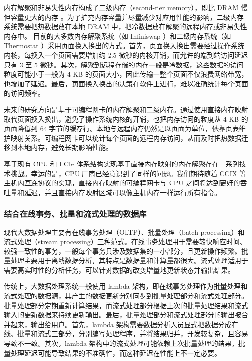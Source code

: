 内存解聚和非易失性内存构成了二级内存（second-tier memory），即比 DRAM 慢但容量更大的内存 \cite{dulloor2016data}。为了扩充内存容量并尽量减少对应用性能的影响，二级内存系统需要把热数据放在本地 DRAM 中，把冷数据放在解聚的远程内存或非易失性内存中。
目前的大多数内存解聚系统（如 Infiniswap \cite{gu2017efficient}）和二级内存系统（如 Thermostat \cite{agarwal2017thermostat}）采用页面换入换出的方式。首先，页面换入换出需要经过操作系统内核，每换入一个页面需要增加约 2.5 微秒的内核开销，而允许的端到端访问延迟只有 3 至 5 微秒。其次，解聚到远程存储的内存一般是冷数据，这些数据的访问粒度可能小于一般为 4 KB 的页面大小，因此传输一整个页面不仅浪费网络带宽，也增加了延迟。最后，页面换入换出的决策在软件上进行，难以准确统计每个页面的访问频率。

未来的研究方向是基于可编程网卡的内存解聚和二级内存。通过使用直接内存映射取代页面换入换出，避免了操作系统内核的开销，也把内存访问的粒度从 4 KB 的页面降低到 64 字节的缓存行。本地与远程内存仍然是以页面为单位，依靠页表维护映射关系。可编程网卡可以统计每个页面的远程内存访问，从而及时把热数据迁移到本地内存，避免长期影响性能。

基于现有 CPU 和 PCIe 体系结构实现基于直接内存映射的内存解聚存在一系列技术挑战。幸运的是，CPU 厂商已经意识到了同样的问题。我们期待随着 CCIX 等主机内互连协议的实现，直接内存映射的可编程网卡与 CPU 之间将达到更好的吞吐量和延迟，并且直接内存映射区域可以像主机内存一样运行所有指令。

\subsubsection{结合在线事务、批量和流式处理的数据库}
\label{future:reactdb}

现代大数据处理主要有在线事务处理（OLTP）、批量处理（batch processing）和流式处理（stream processing）三种范式。在线事务处理用于需要较快响应时间、较强一致性的事务，一般每个事务只涉及数据集的一小部分，且更新操作频繁。批量处理主要用于离线数据分析，其特点是数据量和计算量都很大。流式处理适用于需要高实时性的分析任务，可以针对数据的改变增量地更新状态并输出结果。

传统上，大数据处理系统一般使用 lambda 架构，即在线事务处理作为批量处理和流式处理的数据源，其产生的数据更新分别同步到批量处理部分和流式处理部分。批量处理部分定期重新计算结果，而流式处理部分根据上次的批量处理结果和流式输入的更新数据来持续更新输出。最后，批量处理部分和流式处理部分的输出被合并起来，输出给用户。首先，lambda 架构需要数据分析人员显式把数据分成在线、批量和流式三部分，分别编写处理程序，并将结果归并，开发较复杂，且容易导致不一致。其次，lambda 架构中的流式处理可能依赖上次批量处理的结果，批量处理延迟可能导致结果的不准确性，而这种延迟在性能上不一定必要。


